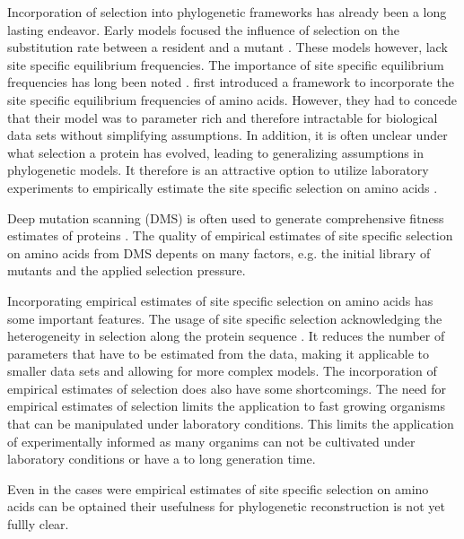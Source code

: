 \documentclass[12pt]{article}
\begin{document}
Incorporation of selection into phylogenetic frameworks has already been a long lasting endeavor.
Early models focused the influence of selection on the substitution rate between a resident and a mutant \citep{GoldmanAndYang1994, MuseAndGaut1994, thorne1996}.
These models however, lack site specific equilibrium frequencies.
The importance of site specific equilibrium frequencies has long been noted \citep{felsenstein1981, gojobori1983}.
\citet{HalpernAndBruno1998} first introduced a framework to incorporate the site specific equilibrium frequencies of amino acids.
However, they had to concede that their model was to parameter rich and therefore intractable for biological data sets without simplifying assumptions.
In addition, it is often  unclear under what selection a protein has evolved, leading to generalizing assumptions in phylogenetic models.
It therefore is an attractive option to utilize laboratory experiments to empirically estimate the site specific selection on amino acids \citep{bloom2014}.

Deep mutation scanning (DMS) is often used to generate comprehensive fitness estimates of proteins \citep{Fowler2014}.
The quality of empirical estimates of site specific selection on amino acids from DMS depents on many factors, e.g. the initial library of mutants and the applied selection pressure.

Incorporating empirical estimates of site specific selection on amino acids has some important features.
The usage of site specific selection acknowledging the heterogeneity in selection along the protein sequence \citep{hilton2017}.
It reduces the number of parameters that have to be estimated from the data, making it applicable to smaller data sets and allowing for more complex models.
The incorporation of empirical estimates of selection does also have some shortcomings.
The need for empirical estimates of selection limits the application to fast growing organisms that can be manipulated under laboratory conditions.
This limits the application of experimentally informed as many organims can not be cultivated under laboratory conditions or have a to long generation time.

Even in the cases were empirical estimates of site specific selection on amino acids can be optained their usefulness for phylogenetic reconstruction is not yet fullly clear.
\end{document}
